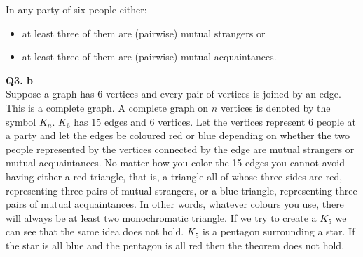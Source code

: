 \documentclass[a4paper,12pt]{article}
\begin{document}
In any party of six people either:
\begin{itemize}
\item at least three of them are (pairwise) mutual strangers or
\item at least three of them are (pairwise) mutual acquaintances.
\end{itemize}
\noindent \textbf{Q3. b} \\
Suppose a graph has 6 vertices and every pair of vertices is joined by an edge. This is a complete graph. A complete graph on $n$ vertices is denoted by the symbol $K_{n}$. $K_{6}$ has 15 edges and 6 vertices. Let the vertices represent 6 people at a party and let the edges be coloured red or blue depending on whether the two people represented by the vertices connected by the edge are mutual strangers or mutual acquaintances. No matter how you color the 15 edges you cannot avoid having either a red triangle, that is, a triangle all of whose three sides are red, representing three pairs of mutual strangers, or a blue triangle, representing three pairs of mutual acquaintances. In other words, whatever colours you use, there will always be at least two monochromatic triangle. If we try to create a $K_{5}$ we can see that the same idea does not hold. $K_{5}$ is a pentagon surrounding a star. If the star is all blue and the pentagon is all red then the theorem does not hold. 
\end{document}
